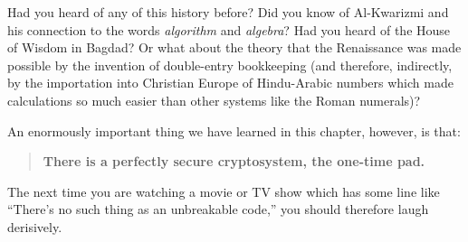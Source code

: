 \documentclass[12pt,letterpaper]{amsbook}
\theoremstyle{definition}
\theoremstyle{remark}
\numberwithin{figure}{section}
\numberwithin{exercise}{chapter}
\numberwithin{section}{chapter}
\numberwithin{equation}{section}
\numberwithin{table}{subsection}
\begin{document}
\vskip2mm
\begin{AZtcb}[label=az:fibonacci]{}{}
  Had you heard of any of this history before?  Did you know of Al-Kwarizmi
  and his connection to the words \textit{algorithm} and \textit{algebra}?
  Had you heard of the House of Wisdom in Bagdad?  Or what about the theory
  that the Renaissance was made possible by the invention of double-entry
  bookkeeping (and therefore, indirectly, by the importation into Christian
  Europe of Hindu-Arabic numbers which made calculations so much easier than
  other systems like the Roman numerals)?
\end{AZtcb}

An enormously important thing we have learned in this chapter, however, is
that:
\begin{quote}
{\bf There is a perfectly secure cryptosystem, the one-time pad.}
\end{quote}
The next time you are watching a movie or TV show which has some line like
``There's no such thing as an unbreakable code,'' you should therefore laugh
derisively.
\end{document}
